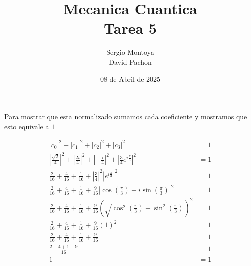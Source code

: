 \documentclass{report}
\title{\Huge{Mecanica Cuantica}\\Tarea 5}
\author{\huge{Sergio Montoya}\\ \huge{David Pachon}}
\date{08 de Abril de 2025}
\begin{document}
\maketitle
\newpage%
\tableofcontents
\pagebreak

\chapter{}

\chapter{}

\section{}

Para mostrar que esta normalizado sumamos cada coeficiente y mostramos que esto equivale a $1$

\begin{align*}
  \left| c_0 \right|^2 +
  \left| c_1 \right|^2 +
  \left| c_2 \right|^2 +
  \left| c_3 \right|^2 &= 1\\
  \left| \frac{\sqrt{2}}{4} \right|^2 +
  \left| \frac{2i}{4} \right|^2 +
  \left| - \frac{i}{4} \right|^2 +
  \left| \frac{3}{4}e^{i \frac{\pi}{3}} \right|^2 &= 1\\
  \frac{2}{16} +
  \frac{4}{16} +
  \frac{1}{16} +
  \left| \frac{3}{4}\right|^2 \left|e^{i \frac{\pi}{3}} \right|^2 &= 1\\
  \frac{2}{16} +
  \frac{4}{16} +
  \frac{1}{16} +
  \frac{9}{16}\left|\cos\left(\frac{\pi}{3}\right) + i\sin\left(\frac{\pi}{3}\right)\right|^2 &= 1\\
  \frac{2}{16} +
  \frac{4}{16} +
  \frac{1}{16} +
  \frac{9}{16}\left(\sqrt{\cos^2\left(\frac{\pi}{3}\right) + \sin^2\left(\frac{\pi}{3}\right)}\right)^2 &= 1\\
  \frac{2}{16} +
  \frac{4}{16} +
  \frac{1}{16} +
  \frac{9}{16}\left( 1 \right)^2 &= 1\\
  \frac{2}{16} +
  \frac{4}{16} +
  \frac{1}{16} +
  \frac{9}{16} &= 1\\
  \frac{2 + 4 + 1 + 9}{16} &= 1\\
  1 &= 1\\
\end{align*}

\section{}
\end{document}
